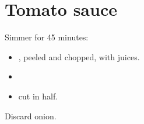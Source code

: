 \section{Tomato sauce}

Simmer for 45 minutes:

\begin{itemize}
\item {},
      peeled and chopped, with juices.
\item {}
\item {} cut in half.
\end{itemize}

Discard onion.
